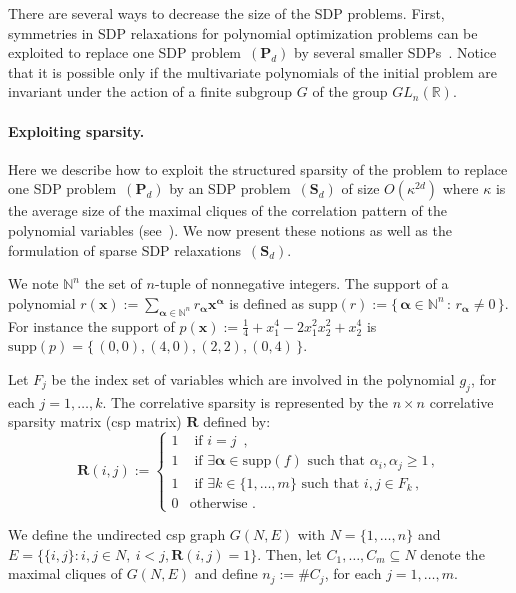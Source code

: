 \documentclass[preprint]{sigplanconf}
\newcommand{\suppf}[1]{\text{supp}(#1)}
\newcommand{\mons}[2]{\N_{#1}^{#2}}
\newcommand{\R}{\mathbb{R}}
\newcommand{\N}{\mathbb{N}}
\newcommand{\x}{\mathbf{x}}
\newcommand{\alphab}{\boldsymbol{\alpha}}
\def\P{\mathbf{P}}
\def\S{\mathbf{S}}
\def\S{\mathbf{S}}
\theoremstyle{plain}
\begin{document}
There are several ways to decrease the size of the SDP problems. 
First, symmetries in SDP relaxations for polynomial optimization problems can be exploited to replace one SDP problem~$(\P_d)$ by
several smaller SDPs~\cite{Riener2013SymmetricSDP}. Notice that it is possible only if the multivariate polynomials of the initial problem are invariant under the action of a finite subgroup $G$ of the group $GL_{n}(\R)$. 
%

\paragraph{Exploiting sparsity.} Here we describe how to exploit the structured sparsity of the
problem to replace one SDP problem~$(\P_d)$ by an SDP problem~$(\S_d)$ of
size $O (\kappa^ {2 d})$ where $\kappa$ is the average size
of the maximal cliques of the correlation pattern of the polynomial
variables (see~\cite{Waki06SparseSOS}). We now present these notions as well as the formulation of sparse SDP relaxations~$(\S_d)$.

We note $\N^n$ the set of $n$-tuple of nonnegative integers. The support of a polynomial $r(\x) := \sum_{\alphab \in \N^n} r_{\alphab} \x^{\alphab}$ is defined as $\suppf{r} := \{ \, \alphab \in \N^n \, : \, r_{\alphab} \neq 0 \, \}$. For instance the support of $p(\x) := \frac{1}{4} + x_1^4 - 2 x_1^2 x_2^2 + x_2^4$ is $\suppf{p} = \{ \, (0,0), (4, 0), (2,2), (0,4) \, \}$.

Let $F_j$ be the index set of variables which are involved in the polynomial $g_j$, for each $j=1, \dots, k$.
The correlative sparsity is represented by the 
$n \times n$ correlative sparsity matrix (csp matrix) $\mathbf{R}$ defined by:
\begin{equation*}
\label{eq:csp}
\mathbf{R}(i, j) := \left \{
\begin{array}{ll}
  1 & \text{ if }  i = j \enspace, \\
  1 & \text{ if }  \exists \alphab \in \suppf{f} \text{ such that } \alpha_i, \alpha_j \geq 1 \,, \\
  1 & \text{ if }  \exists k \in \{1, \dots, m\} \text{ such that } i, j \in F_k  \,,\\
  0 & \text{otherwise .} 
\end{array} \right.
\end{equation*}

We define the undirected csp graph $G(N, E)$ with
 $N = \{ 1, \dots, n \}$ and $E = \{\{i, j\} : i, j \in N , \ i < j , \mathbf{R}(i, j) = 1 \}$. 
Then, let $C_1,\dots, C_m \subseteq N$ denote the maximal cliques of $G(N, E)$ and 
 define $n_j := \#C_j$, for each $j=1 ,\dots,m$.
\end{document}

